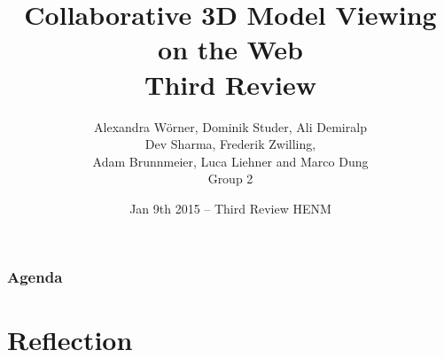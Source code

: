 

\title[Collaborative 3D Model Viewing on the Web]{Collaborative 3D Model Viewing on the Web\\ Third Review}
\author[Group 2]{%
  Alexandra Wörner, Dominik Studer, Ali Demiralp\\ Dev Sharma, Frederik Zwilling, \\
  Adam Brunnmeier, Luca Liehner and Marco Dung\\
  \bigskip
  {\scriptsize Group 2}
}

\date[Jan 9th 2015 @ HENM 2015]{Jan 9th 2015 -- Third Review HENM}



\frame[plain]{\titlepage}
\addtocounter{framenumber}{-1}

\begin{frame}
  \frametitle{Agenda}
  \tableofcontents[hideallsubsections]
\end{frame}

\section{Reflection}

